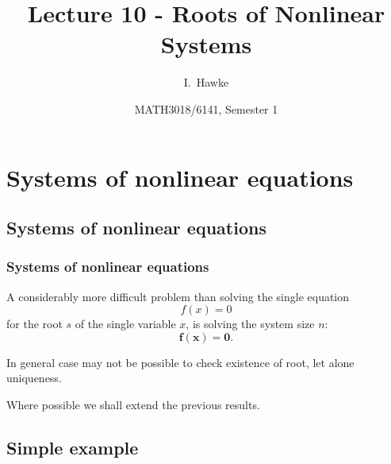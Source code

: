 \documentclass{beamer}
\title[Lecture 10] %
{Lecture 10 - Roots of Nonlinear Systems}
\author[I. Hawke] %
{I.~Hawke}
\institute[University of Southampton] %
{
  School of Mathematics, \\
  University of Southampton, UK
}
\date[Semester 1] %
{MATH3018/6141, Semester 1}
\newcommand{\bfm}[1]{{\boldsymbol{#1}}}
\begin{document}
\begin{frame}
  \titlepage
\end{frame}


\section{Systems of nonlinear equations}

\subsection{Systems of nonlinear equations}

\begin{frame}
  \frametitle{Systems of nonlinear equations}

  A considerably more difficult problem than solving the single equation
  \begin{equation*}
    f(x) = 0
  \end{equation*}
  for the root $s$ of the single variable $x$, is solving the system
  size $n$:
  \begin{equation*}
    \bfm{f}(\bfm{x}) = \bfm{0}.
  \end{equation*} \pause

  \vspace{1ex}

  In general case may not be possible to check existence of root, let alone uniqueness.

  \vspace{1ex}

  Where possible we shall extend the previous results.

\end{frame}

\subsection{Simple example}
\end{document}
